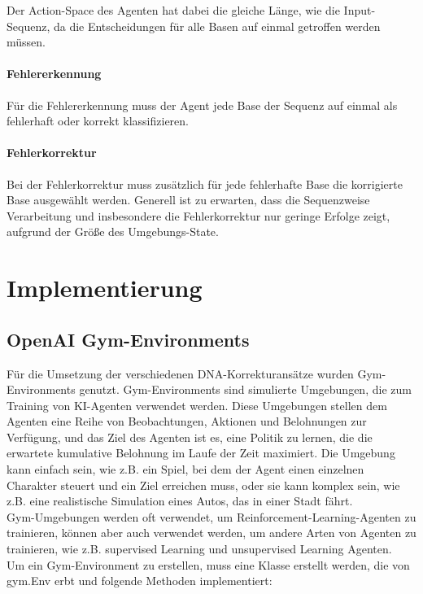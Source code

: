 \documentclass[oneside,bibliography=totocnumbered,BCOR=5mm]{scrbook}%
\theoremstyle{definition}
\theoremstyle{definition}
\theoremstyle{definition}
\theoremstyle{definition}
\theoremstyle{definition}
\theoremstyle{definition}
\begin{document}
Der Action-Space des Agenten hat dabei die gleiche Länge, wie die Input-Sequenz, da die Entscheidungen
für alle Basen auf einmal getroffen werden müssen.
\subsubsection{Fehlererkennung}
Für die Fehlererkennung muss der Agent jede Base der Sequenz auf einmal als fehlerhaft oder korrekt klassifizieren.
\subsubsection{Fehlerkorrektur}
Bei der Fehlerkorrektur muss zusätzlich für jede fehlerhafte Base die korrigierte Base ausgewählt werden.
Generell ist zu erwarten, dass die Sequenzweise Verarbeitung und insbesondere die Fehlerkorrektur nur geringe
Erfolge zeigt, aufgrund der Größe des Umgebungs-State.



\clearpage


\chapter{Implementierung}

\section{OpenAI Gym-Environments}

Für die Umsetzung der verschiedenen DNA-Korrekturansätze wurden Gym-Environments genutzt.
Gym-Environments sind simulierte Umgebungen, die zum Training von KI-Agenten verwendet werden. 
Diese Umgebungen stellen dem Agenten eine Reihe von Beobachtungen, Aktionen und Belohnungen zur Verfügung, 
und das Ziel des Agenten ist es, eine Politik zu lernen, 
die die erwartete kumulative Belohnung im Laufe der Zeit maximiert. 
Die Umgebung kann einfach sein, wie z.B. ein Spiel, bei dem der Agent einen einzelnen Charakter steuert und 
ein Ziel erreichen muss, oder sie kann komplex sein, wie z.B. eine realistische Simulation eines Autos, 
das in einer Stadt fährt. \\

Gym-Umgebungen werden oft verwendet, um Reinforcement-Learning-Agenten zu trainieren, 
können aber auch verwendet werden, um andere Arten von Agenten zu trainieren, 
wie z.B. supervised Learning und unsupervised Learning Agenten.\\

Um ein Gym-Environment zu erstellen, muss eine Klasse erstellt werden, 
die von gym.Env erbt und folgende Methoden implementiert:\\
\end{document}
